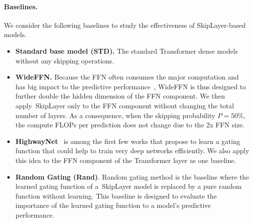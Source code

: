 \documentclass{article}
\newcommand{\skipl}{SkipLayer\xspace}
\begin{document}
\paragraph{Baselines.}
We consider the following baselines to study the effectiveness of \skipl-based models.
\begin{itemize}
    \item \textbf{Standard base model (STD).} The standard Transformer dense models without any skipping operations.
    \item \textbf{WideFFN.} Because the FFN often consumes the major computation and has big impact to the predictive performance~\cite{kocsis2022lowdataregime}, WideFFN is thus designed to further double the hidden dimension of the FFN component. We then apply~\skipl only to the FFN component without changing the total number of layers. As a consequence, when the skipping probability $P=50\%$, the compute FLOPs per prediction does not change due to the 2x FFN size.
    \item \textbf{HighwayNet}~\cite{srivastava2015highway} is among the first few works that propose to learn a gating function that could help to train very deep networks efficiently. We also apply this idea to the FFN component of the Transformer layer as one baseline.
    \item \textbf{Random Gating (Rand)}. Random gating method is the baseline where the learned gating function of a~\skipl model is replaced by a pure random function without learning. This baseline is designed to evaluate the importance of the learned gating function to a model's predictive performance.
\end{itemize}
\end{document}
